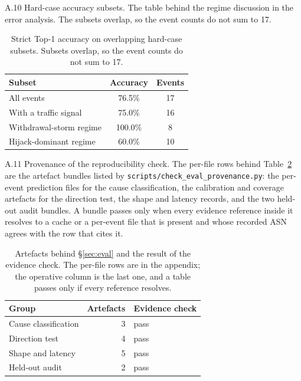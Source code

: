 A.10 Hard-case accuracy subsets.
The table behind the regime discussion in the error analysis. The
subsets overlap, so the event counts do not sum to 17.

\begin{table}[!htbp]
  \caption{Strict Top-1 accuracy on overlapping hard-case subsets.
  Subsets overlap, so the event counts do not sum to 17.}
  \label{tab:robustness}
  \centering
  \small
  \begin{tabular}{lcc}
    \toprule
    Subset                          & Accuracy & Events \\ \midrule
    All events                      & 76.5\%   & 17    \\
    With a traffic signal           & 75.0\%   & 16    \\
    Withdrawal-storm regime         & 100.0\%  & 8     \\
    Hijack-dominant regime          & 60.0\%   & 10    \\ \bottomrule
  \end{tabular}
\end{table}

A.11 Provenance of the reproducibility check.\label{app:provenance}
The per-file rows behind
Table~\ref{tab:provenance} are the artefact bundles listed by
\texttt{scripts/check\_eval\_provenance.py}: the per-event prediction
files for the cause classification, the calibration and coverage artefacts
for the direction test, the shape and latency records, and the two
held-out audit bundles. A bundle passes only when every evidence reference
inside it resolves to a cache or a per-event file that is present and whose
recorded ASN agrees with the row that cites it.

\begin{table}[!htbp]
\centering
\caption{Artefacts behind \S\ref{sec:eval} and the result of the
evidence check. The per-file rows are in the appendix; the operative
column is the last one, and a table passes only if every reference
resolves.}
\label{tab:provenance}
\footnotesize
\setlength{\tabcolsep}{4pt}
\begin{tabular}{@{}lrl@{}}
\hline
\textbf{Group} & \textbf{Artefacts} & \textbf{Evidence check} \\
\hline
Cause classification & 3 & pass \\
Direction test     & 4 & pass \\
Shape and latency  & 5 & pass \\
Held-out audit     & 2 & pass \\
\hline
\end{tabular}
\end{table}

